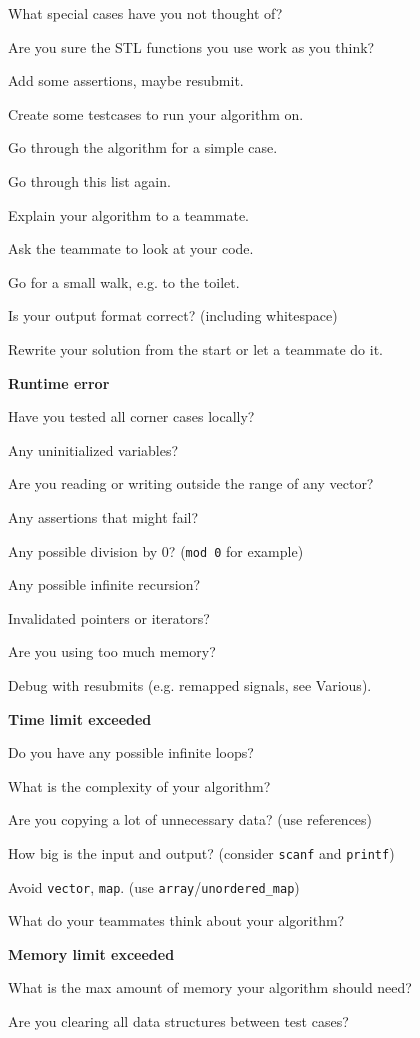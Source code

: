 \documentclass[a4paper]{article}
\begin{document}
\noindent
What special cases have you not thought of?

\noindent
Are you sure the STL functions you use work as you think?

\noindent
Add some assertions, maybe resubmit.

\noindent
Create some testcases to run your algorithm on.

\noindent
Go through the algorithm for a simple case.

\noindent
Go through this list again.

\noindent
Explain your algorithm to a teammate.

\noindent
Ask the teammate to look at your code.

\noindent
Go for a small walk, e.g. to the toilet.

\noindent
Is your output format correct? (including whitespace)

\noindent
Rewrite your solution from the start or let a teammate do it.

\noindent
\textbf{Runtime error}

\noindent
Have you tested all corner cases locally?

\noindent
Any uninitialized variables?

\noindent
Are you reading or writing outside the range of any vector?

\noindent
Any assertions that might fail?

\noindent
Any possible division by 0? (\texttt{mod 0} for example)

\noindent
Any possible infinite recursion?

\noindent
Invalidated pointers or iterators?

\noindent
Are you using too much memory?

\noindent
Debug with resubmits (e.g. remapped signals, see Various).

\noindent
\textbf{Time limit exceeded}

\noindent
Do you have any possible infinite loops?

\noindent
What is the complexity of your algorithm?

\noindent
Are you copying a lot of unnecessary data? (use references)

\noindent
How big is the input and output? (consider \texttt{scanf} and \texttt{printf})

\noindent
Avoid \texttt{vector}, \texttt{map}. (use \texttt{array}/\texttt{unordered\_map})

\noindent
What do your teammates think about your algorithm?

\noindent
\textbf{Memory limit exceeded}

\noindent
What is the max amount of memory your algorithm should need?

\noindent
Are you clearing all data structures between test cases?
\end{document}
